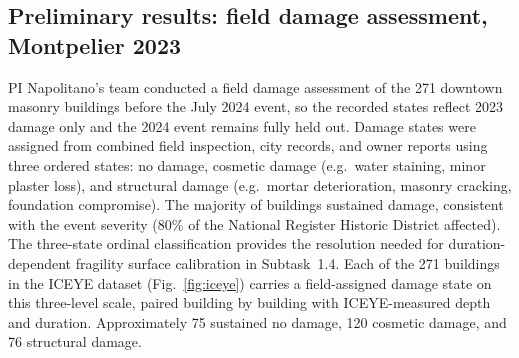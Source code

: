 \documentclass[11pt]{article}
\begin{document}
\vspace{-0.3cm}
\subsection{Preliminary results: field damage assessment, Montpelier 2023}
PI Napolitano's team conducted a field damage assessment of the 271 downtown
masonry buildings before the July 2024 event, so the recorded states reflect
2023 damage only and the 2024 event remains fully held out. Damage states were
assigned from combined field inspection, city records, and owner reports using
three ordered states: no damage, cosmetic damage (e.g.\ water staining, minor
plaster loss), and structural damage (e.g.\ mortar deterioration, masonry
cracking, foundation compromise). The majority of buildings sustained damage,
consistent with the event severity (80\% of the National Register Historic District
affected). The three-state ordinal classification provides the resolution needed
for duration-dependent fragility surface calibration in Subtask~1.4.
Each of the 271 buildings in the ICEYE dataset (Fig.~\ref{fig:iceye}) carries
a field-assigned damage state on this three-level scale, paired building by
building with ICEYE-measured depth and duration. Approximately 75 sustained no
damage, 120 cosmetic damage, and 76 structural damage.

\vspace{-0.3cm}
\end{document}
